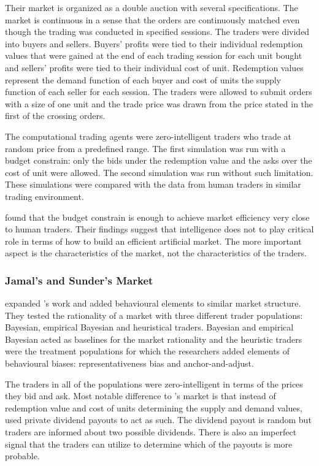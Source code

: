 Their market is organized as a double auction with several
specifications. The market is continuous in a sense that the 
orders are continuously matched even though the trading was
conducted in specified sessions. The traders were divided 
into buyers and sellers. Buyers' profits were tied to their 
individual redemption values that were gained at the end of
each trading session for each unit bought and sellers' profits
were tied to their individual cost of unit. Redemption values
represent the demand function of each buyer and cost of units 
the supply function of each seller for each session. The
traders were allowed to submit orders with a size of one unit
and the trade price was drawn from the price stated in the 
first of the crossing orders.

The computational trading agents were zero-intelligent traders 
who trade at random price from a predefined range. 
The first simulation was run with a budget constrain: only the bids
under the redemption value and the asks over the cost of unit 
were allowed. The second simulation was run without such limitation.
These simulations were compared with the data from human traders
in similar trading environment.

\citeauthor{God93} found that the budget constrain is enough to 
achieve market efficiency very close to human traders. Their findings
suggest that intelligence does not to play critical role in terms of 
how to build an efficient artificial market. The more important aspect
is the characteristics of the market, not the characteristics of the traders.

\subsubsection{Jamal's and Sunder's Market}
\citet{Jam96} expanded \citeauthor{God93}'s work and added behavioural 
elements to similar market structure. They tested the rationality of
a market with three different trader populations: Bayesian, empirical
Bayesian and heuristical traders. Bayesian and empirical Bayesian acted
as baselines for the market rationality and the heuristic traders were
the treatment populations for which the researchers added elements of behavioural
biases: representativeness bias and anchor-and-adjust. 

The traders in all of the populations were zero-intelligent in terms of the
prices they bid and ask. Most notable difference to \citet{God93}'s market
is that instead of redemption value and cost of units determining the
supply and demand values, \citeauthor{Jam96} used private dividend payouts 
to act as such. The dividend payout is random but traders are informed
about two possible dividends. There is also an imperfect signal that the
traders can utilize to determine which of the payouts is more probable. 

